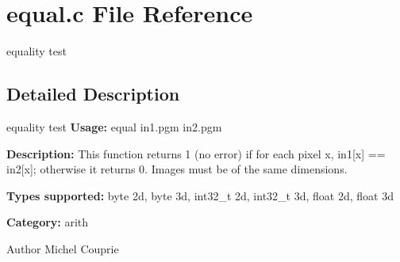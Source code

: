 \section{equal.c File Reference}
\label{equal_8c}


equality test  




\subsection{Detailed Description}
equality test {\bfseries Usage:} equal in1.pgm in2.pgm

{\bfseries Description:} This function returns 1 (no error) if for each pixel x, in1[x] == in2[x]; otherwise it returns 0. Images must be of the same dimensions.

{\bfseries Types supported:} byte 2d, byte 3d, int32\_\-t 2d, int32\_\-t 3d, float 2d, float 3d

{\bfseries Category:} arith

\begin{DoxyAuthor}{Author}
Michel Couprie 
\end{DoxyAuthor}
